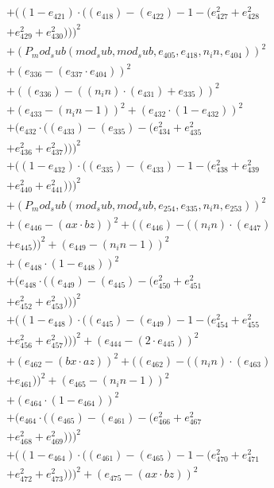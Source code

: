 \documentclass[10pt, a4paper]{article}
\begin{document}
\begin{small}
\begin{align*}
& + ((1 - e_{421})  \cdot  ((e_{418}) - (e_{422}) - 1 - (e_{427}^{2} + e_{428}^{2} \\
& + e_{429}^{2} + e_{430}^{2})))^{2} \\
& + (P_mod_sub(mod_sub, mod_sub, e_{405}, e_{418}, n_in, e_{404}))^{2} \\
& + (e_{336} - (e_{337}  \cdot  e_{404}))^{2} \\
& + ((e_{336}) - ((n_in)  \cdot  (e_{431}) + e_{335}))^{2} \\
& + (e_{433} - (n_in - 1))^{2} + (e_{432}  \cdot  (1 - e_{432}))^{2} \\
& + (e_{432}  \cdot  ((e_{433}) - (e_{335}) - (e_{434}^{2} + e_{435}^{2} \\
& + e_{436}^{2} + e_{437}^{2})))^{2} \\
& + ((1 - e_{432})  \cdot  ((e_{335}) - (e_{433}) - 1 - (e_{438}^{2} + e_{439}^{2} \\
& + e_{440}^{2} + e_{441}^{2})))^{2} \\
& + (P_mod_sub(mod_sub, mod_sub, e_{254}, e_{335}, n_in, e_{253}))^{2} \\
& + (e_{446} - (ax  \cdot  bz))^{2} + ((e_{446}) - ((n_in)  \cdot  (e_{447}) \\
& + e_{445}))^{2} + (e_{449} - (n_in - 1))^{2} \\
& + (e_{448}  \cdot  (1 - e_{448}))^{2} \\
& + (e_{448}  \cdot  ((e_{449}) - (e_{445}) - (e_{450}^{2} + e_{451}^{2} \\
& + e_{452}^{2} + e_{453}^{2})))^{2} \\
& + ((1 - e_{448})  \cdot  ((e_{445}) - (e_{449}) - 1 - (e_{454}^{2} + e_{455}^{2} \\
& + e_{456}^{2} + e_{457}^{2})))^{2} + (e_{444} - (2  \cdot  e_{445}))^{2} \\
& + (e_{462} - (bx  \cdot  az))^{2} + ((e_{462}) - ((n_in)  \cdot  (e_{463}) \\
& + e_{461}))^{2} + (e_{465} - (n_in - 1))^{2} \\
& + (e_{464}  \cdot  (1 - e_{464}))^{2} \\
& + (e_{464}  \cdot  ((e_{465}) - (e_{461}) - (e_{466}^{2} + e_{467}^{2} \\
& + e_{468}^{2} + e_{469}^{2})))^{2} \\
& + ((1 - e_{464})  \cdot  ((e_{461}) - (e_{465}) - 1 - (e_{470}^{2} + e_{471}^{2} \\
& + e_{472}^{2} + e_{473}^{2})))^{2} + (e_{475} - (ax  \cdot  bz))^{2} \\

\end{align*}
\end{small}
\end{document}
